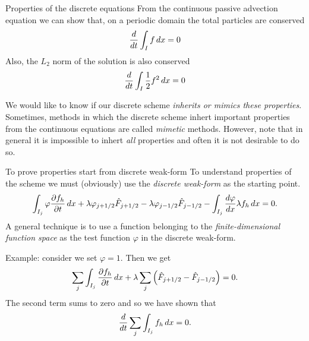 \documentclass[aspectratio=169]{beamer}
\newcommand{\mypause}{\pause}
\newcommand{\pfrac}[2]{\frac{\partial #1}{\partial #2}}
\begin{document}
\begin{frame}{Properties of the discrete equations}
  From the continuous passive advection equation we can show that, on
  a periodic domain the total particles are conserved
  \begin{align*}
    \frac{d}{dt}\int_I f \thinspace dx = 0
  \end{align*}
  Also, the $L_2$ norm of the solution is also conserved
  \begin{align*}
    \frac{d}{dt}\int_I \frac{1}{2} f^2 \thinspace dx = 0
  \end{align*}  

  We would like to know if our discrete scheme \emph{inherits or
    mimics these properties}. Sometimes, methods in which the discrete
  scheme inhert important properties from the continuous equations are
  called \emph{mimetic} methods. However, note that in general it is
  impossible to inhert \emph{all} properties and often it is not
  desirable to do so.
  
\end{frame}


\begin{frame}{To prove properties start from discrete weak-form}
  \footnotesize
  To understand properties of the scheme we must (obviously) use the
  \emph{discrete weak-form} as the starting point.
  \begin{align*}
    \int_{I_j} \varphi \pfrac{f_h}{t}\thinspace dx
    +
    \lambda \varphi_{j+1/2}\hat{F}_{j+1/2} - \lambda \varphi_{j-1/2}\hat{F}_{j-1/2}
    -
    \int_{I_j}  \frac{d\varphi}{dx}\lambda f_h\thinspace dx = 0.
  \end{align*}
  A general technique is to use a function belonging to the
  \emph{finite-dimensional function space} as the test function
  $\varphi$ in the discrete weak-form.
  \mypause%

  Example: consider we set $\varphi = 1$. Then we get
  \begin{align*}
    \sum_j \int_{I_j} \pfrac{f_h}{t}\thinspace dx
    +
    \lambda \sum_j \left(
    \hat{F}_{j+1/2} - \hat{F}_{j-1/2}
    \right) = 0.
  \end{align*}
  The second term sums to zero and so we have shown that
  \begin{align*}
    \frac{d}{dt}\sum_j \int_{I_j} f_h\thinspace dx = 0.
  \end{align*}  
\end{frame}
\end{document}
